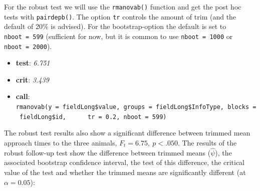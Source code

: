 \documentclass[
]{article}
\newenvironment{Shaded}{\begin{snugshade}}{\end{snugshade}}
\newcommand{\AttributeTok}[1]{\textcolor[rgb]{0.13,0.29,0.53}{#1}}
\newcommand{\CommentTok}[1]{\textcolor[rgb]{0.56,0.35,0.01}{\textit{#1}}}
\newcommand{\DecValTok}[1]{\textcolor[rgb]{0.00,0.00,0.81}{#1}}
\newcommand{\FloatTok}[1]{\textcolor[rgb]{0.00,0.00,0.81}{#1}}
\newcommand{\FunctionTok}[1]{\textcolor[rgb]{0.13,0.29,0.53}{\textbf{#1}}}
\newcommand{\NormalTok}[1]{#1}
\newcommand{\SpecialCharTok}[1]{\textcolor[rgb]{0.81,0.36,0.00}{\textbf{#1}}}
\providecommand{\tightlist}{%
  \setlength{\itemsep}{0pt}\setlength{\parskip}{0pt}}
\begin{document}
For the robust test we will use the \texttt{rmanovab()} function and get the post hoc tests with \texttt{pairdepb()}. The option \texttt{tr} controls the amount of trim (and the default of 20\% is advised). For the bootstrap-option the default is set to \texttt{nboot\ =\ 599} (sufficient for now, but it is common to use \texttt{nboot\ =\ 1000} or \texttt{nboot\ =\ 2000}).

\begin{Shaded}
\end{Shaded}

\begin{itemize}
\tightlist
\item
  \textbf{test}: \emph{6.751}
\item
  \textbf{crit}: \emph{3.439}
\item
  \textbf{call}: \texttt{rmanovab(y\ =\ fieldLong\$value,\ groups\ =\ fieldLong\$InfoType,\ blocks\ =\ fieldLong\$id,\ \ \ \ \ \ tr\ =\ 0.2,\ nboot\ =\ 599)}
\end{itemize}

The robust test results also show a significant difference between trimmed mean approach times to the three animals, \(F_t = 6.75, \ p < .050\). The results of the robust follow-up test show the difference between trimmed means (\(\hat{\psi}\)), the associated bootstrap confidence interval, the test of this difference, the critical value of the test and whether the trimmed means are significantly different (at \(\alpha = 0.05\)):

\begin{Shaded}
\end{Shaded}
\end{document}
